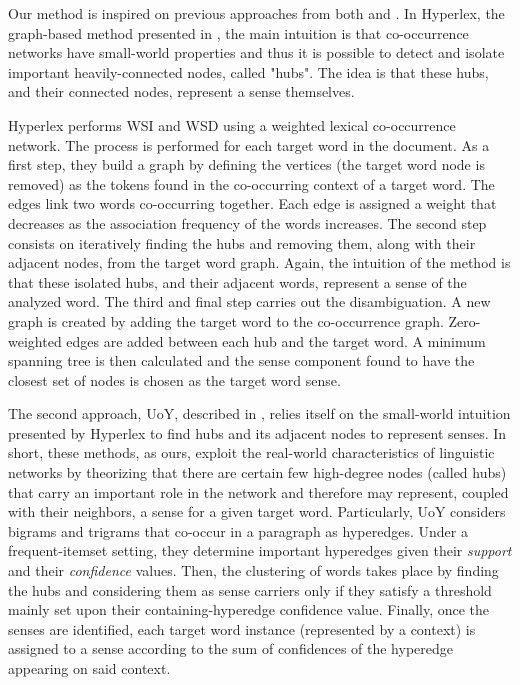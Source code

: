 Our method  is inspired on previous approaches from both \cite{2004.Veronis} and \cite{2007.Klapaftis.UoY}. In Hyperlex,  the graph-based  method presented  in \cite{2004.Veronis}, the main intuition is that co-occurrence networks have small-world properties and thus it is possible to detect and isolate important heavily-connected nodes, called "hubs". The idea is that these hubs, and their connected nodes, represent a sense themselves. 

Hyperlex performs WSI and WSD using a weighted lexical co-occurrence network. The process is performed for each target word in the document. As a first step, they build a  graph by defining the vertices (the target word node is removed) as the tokens found in the  co-occurring  context of a target word. The edges link two words co-occurring together. Each edge is assigned a weight that decreases as the association frequency of the words increases. The second step consists on iteratively finding the hubs and removing them, along with their adjacent nodes, from the target word graph. Again, the intuition of the method is that these isolated hubs, and their adjacent words, represent a sense of the analyzed word. The third and final step carries out the disambiguation. A new graph is created by adding the target word to the co-occurrence graph. Zero-weighted edges are added between each hub and the target word. A minimum spanning tree is then calculated and the sense component found to have the closest set of nodes is chosen as the target word sense.

The second approach, {UoY}, described in \cite{2007.Klapaftis.UoY},  relies itself on the small-world intuition presented  by Hyperlex to find hubs and its adjacent nodes to represent senses.   In short, these methods, as ours, exploit the real-world characteristics of linguistic networks by theorizing that there are certain few high-degree nodes (called hubs) that carry an important role in the network and therefore may represent, coupled with their neighbors, a sense for a given target word. Particularly, UoY considers bigrams and trigrams that co-occur in a paragraph as hyperedges. Under a frequent-itemset setting, they determine important hyperedges given their \textit{support} and their \textit{confidence}  values. Then, the clustering of words takes place by finding the hubs and considering them as sense carriers only if they satisfy a threshold mainly set upon their containing-hyperedge confidence value. Finally, once the senses are identified, each target word instance (represented by a context) is assigned to a sense according to the sum of confidences of the hyperedge appearing on said context. 

